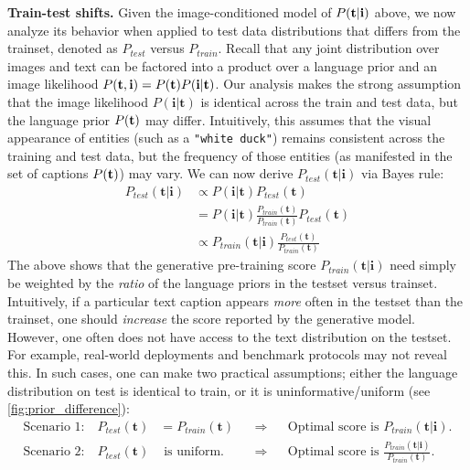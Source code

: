 \documentclass{article} \usepackage{iclr2024_conference,times}
\begin{document}
{\bf Train-test shifts.} Given the image-conditioned model of $P({\bf t}|{\bf i})$ above, we now analyze its behavior when applied to test data distributions that differs from the trainset, denoted as $P_{test}$ versus $P_{train}$. 
Recall that any joint distribution over images and text can be factored into a product over a language prior and an image likelihood $P({\bf t},{\bf i}) = P({\bf t})P({\bf i}|{\bf t})$. Our analysis makes the strong assumption that the image likelihood $P(\mathbf{i}|\mathbf{t})$ is identical across the train and test data, but the language prior $P({\bf t})$ may differ. Intuitively, this assumes that the visual appearance of entities (such as a {\tt "white duck"}) remains consistent across the training and test data, but the frequency of those entities (as manifested in the set of captions $P({\bf t})$) may vary. We can now derive $P_{test}(\mathbf{t} | \mathbf{i})$ via Bayes rule:
\begin{align}
    P_{test}(\mathbf{t} | \mathbf{i}) &\propto P(\mathbf{i}|\mathbf{t}) P_{test}(\mathbf{t}) \\
    &= P(\mathbf{i}|\mathbf{t}) \frac{P_{train}(\mathbf{t})}{P_{train}(\mathbf{t})} P_{test}(\mathbf{t}) \\
    &\propto P_{train}(\mathbf{t}|\mathbf{i}) \frac{P_{test}(\mathbf{t})}{P_{train}(\mathbf{t})} 
\label{eq:optimal_i2t}
\end{align}
The above shows that the generative pre-training score $P_{train}(\mathbf{t}|\mathbf{i})$ need simply be weighted by the {\em ratio} of the language priors in the testset versus trainset. Intuitively, if a particular text caption appears {\em more} often in the testset than the trainset, one should {\em increase} the score reported by the generative model. However, one often does not have access to the text distribution on the testset. For example, real-world deployments and benchmark protocols may not reveal this. In such cases, one can make two practical assumptions; either the language distribution on test is identical to train, or it is uninformative/uniform (see \autoref{fig:prior_difference}):
\begin{align}
\text{Scenario 1:} \quad P_{test}(\mathbf{t}) &=  P_{train}(\mathbf{t}) &&\Rightarrow  &&\text{Optimal score is } P_{train}(\mathbf{t} | \mathbf{i}). \label{eq:same_prior}  \\
\text{Scenario 2:} \quad P_{test}(\mathbf{t}) &\text{ is uniform.} &&\Rightarrow &&\text{Optimal score is } \frac{P_{train}(\mathbf{t}|\mathbf{i})}{P_{train}(\mathbf{t})}. \label{eq:uniform_prior}
\end{align}
\end{document}

